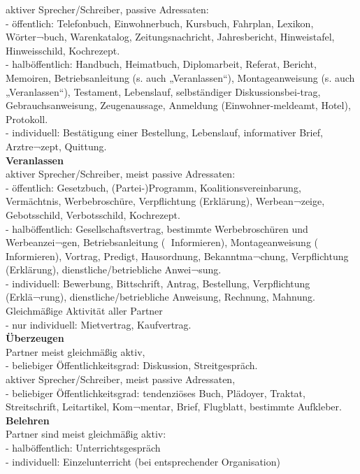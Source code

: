 \documentclass[
  letterpaper,
]{scrbook}
\begin{document}
aktiver Sprecher/Schreiber, passive Adressaten:\\
- öffentlich: Telefonbuch, Einwohnerbuch, Kursbuch, Fahrplan, Lexikon,
Wörter¬buch, Warenkatalog, Zeitungsnachricht, Jahresbericht,
Hinweistafel, Hinweisschild, Kochrezept.\\
- halböffentlich: Handbuch, Heimatbuch, Diplomarbeit, Referat, Bericht,
Memoiren, Betriebsanleitung (s. auch „Veranlassen``), Montageanweisung
(s. auch „Veranlassen``), Testament, Lebenslauf, selbständiger
Diskussionsbei-trag, Gebrauchsanweisung, Zeugenaussage, Anmeldung
(Einwohner-meldeamt, Hotel), Protokoll.\\
- individuell: Bestätigung einer Bestellung, Lebenslauf, informativer
Brief, Arztre¬zept, Quittung.\\

\textbf{Veranlassen}\\
aktiver Sprecher/Schreiber, meist passive Adressaten:\\
- öffentlich: Gesetzbuch, (Partei-)Programm, Koalitionsvereinbarung,
Vermächtnis, Werbebroschüre, Verpflichtung (Erklärung), Werbean¬zeige,
Gebotsschild, Verbotsschild, Kochrezept.\\
- halböffentlich: Gesellschaftsvertrag, bestimmte Werbebroschüren und
Werbeanzei¬gen, Betriebsanleitung ( Informieren), Montageanweisung (
Informieren), Vortrag, Predigt, Hausordnung, Bekanntma¬chung,
Verpflichtung (Erklärung), dienstliche/betriebliche Anwei¬sung.\\
- individuell: Bewerbung, Bittschrift, Antrag, Bestellung, Verpflichtung
(Erklä¬rung), dienstliche/betriebliche Anweisung, Rechnung, Mahnung.\\

Gleichmäßige Aktivität aller Partner\\
- nur individuell: Mietvertrag, Kaufvertrag.\\

\textbf{Überzeugen}\\
Partner meist gleichmäßig aktiv,\\
- beliebiger Öffentlichkeitsgrad: Diskussion, Streitgespräch.\\
aktiver Sprecher/Schreiber, meist passive Adressaten,\\
- beliebiger Öffentlichkeitsgrad: tendenziöses Buch, Plädoyer, Traktat,
Streitschrift, Leitartikel, Kom¬mentar, Brief, Flugblatt, bestimmte
Aufkleber.\\

\textbf{Belehren}\\
Partner sind meist gleichmäßig aktiv:\\
- halböffentlich: Unterrichtsgespräch\\
- individuell: Einzelunterricht (bei entsprechender Organisation)\\
\end{document}
